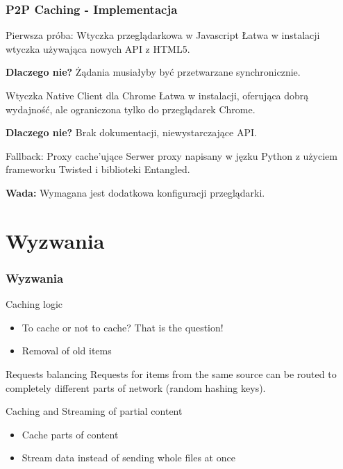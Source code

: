 \documentclass{beamer}
\begin{document}
\begin{frame}
\frametitle{P2P Caching - Implementacja}

\begin{block}{Pierwsza próba: Wtyczka przeglądarkowa w Javascript}
Łatwa w instalacji wtyczka używająca nowych API z HTML5.

\textbf{Dlaczego nie?} Żądania musiałyby być przetwarzane synchronicznie.
\end{block}

\pause
\begin{block}{Wtyczka Native Client dla Chrome}
Łatwa w instalacji, oferująca dobrą wydajność, ale ograniczona tylko do przeglądarek Chrome.

\textbf{Dlaczego nie?} Brak dokumentacji, niewystarczające API.
\end{block}

\pause
\begin{block}{Fallback: Proxy cache'ujące}
Serwer proxy napisany w jęzku Python z użyciem frameworku Twisted i biblioteki Entangled.

\textbf{Wada:} Wymagana jest dodatkowa konfiguracji przeglądarki.
\end{block}

\end{frame}

\section{Wyzwania}
\begin{frame}
\frametitle{Wyzwania}

\begin{block}{Caching logic}
\begin{itemize}
  \item To cache or not to cache? That is the question!
  \item Removal of old items 
\end{itemize}
\end{block}

\pause
\begin{block}{Requests balancing}
Requests for items from the same source can be routed to completely different 
parts of network (random hashing keys).
\end{block}

\pause
\begin{block}{Caching and Streaming of partial content}
\begin{itemize}
  \item Cache parts of content
  \item Stream data instead of sending whole files at once
\end{itemize}
\end{block}

\end{frame}
\end{document}
